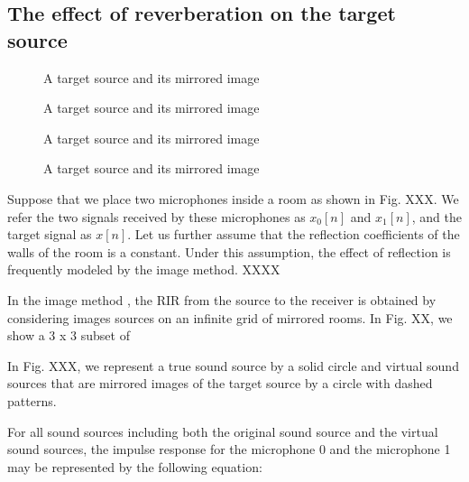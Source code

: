 \documentclass[journal]{IEEEtran}
\begin{document}
\subsection{The effect of reverberation on the target source}

\begin{figure}[!t]
  \centering
    \resizebox{60mm}{!}{}
    \caption {
      A target source and its mirrored image   
    }   
\label{fig:symmetric_configuration}
\end{figure}

\begin{figure}[!t]
  \centering
    \resizebox{60mm}{!}{}
    \caption {
      A target source and its mirrored image   
    }   
\label{fig:asymmetric_configuration}
\end{figure}

\begin{figure}[!t]
  \centering
    \resizebox{60mm}{!}{}
    \caption {
      A target source and its mirrored image   
    }   
\label{fig:one_target_one_virtual}
\end{figure}

\begin{figure}[!t]
  \centering
    \resizebox{60mm}{!}{}
    \caption {
      A target source and its mirrored image   
    }   
\label{fig:one_target_one_virtual}
\end{figure}

Suppose that we place two microphones inside a room as shown in Fig. XXX.
We refer the two signals received by these microphones as 
$x_0[n]$ and $x_1[n]$, and the target signal as $x[n]$.
Let us further assume that the reflection coefficients of the walls
of the room is a constant. Under this assumption, the effect of 
reflection is frequently modeled by the image method. XXXX

In the image method \cite{J_Allen_JASA_1979}, the RIR from the
source to the receiver is obtained by considering images
sources on an infinite grid of mirrored rooms. In Fig. XX, 
we show a 3 x 3 subset of 

In Fig. XXX, we represent a true sound source by a solid circle and
virtual sound sources that are mirrored images of the target source 
by a circle with dashed patterns.

For all sound sources including both the original sound source 
and the virtual sound sources, the impulse response for the
microphone 0 and the microphone 1 may be represented by  
the following equation:
\end{document}
